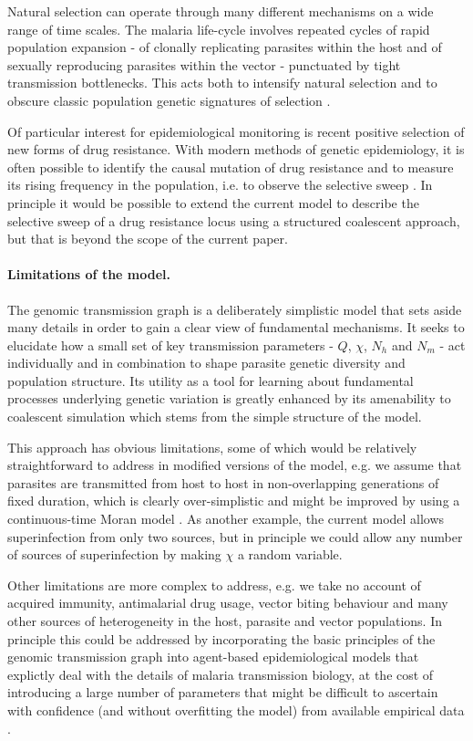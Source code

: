 \documentclass[_main.tex]{subfiles}
\begin{document}
Natural selection can operate through many different mechanisms on a wide range of time scales.  The malaria life-cycle involves repeated cycles of rapid population expansion - of clonally replicating parasites within the host and of sexually reproducing parasites within the vector - punctuated by tight transmission bottlenecks.  This acts both to intensify natural selection and to obscure classic population genetic signatures of selection \cite{Chan2013,Chang2015}.  

Of particular interest for epidemiological monitoring is recent positive selection of new forms of drug resistance.  With modern methods of genetic epidemiology, it is often possible to identify the causal mutation of drug resistance and to measure its rising frequency in the population, i.e. to observe the selective sweep \cite{Anderson2017,Amato2018}.  In principle it would be possible to extend the current model to describe the selective sweep of a drug resistance locus using a structured coalescent approach, but that is beyond the scope of the current paper.

\paragraph{Limitations of the model.}  The genomic transmission graph is a deliberately simplistic model that sets aside many details in order to gain a clear view of fundamental mechanisms.  It seeks to elucidate how a small set of key transmission parameters - $Q$, $\chi$, $N_h$ and $N_m$ - act individually and in combination to shape parasite genetic diversity and population structure.  Its utility as a tool for learning about fundamental processes underlying genetic variation is greatly enhanced by its amenability to coalescent simulation which stems from the simple structure of the model.

This approach has obvious limitations, some of which would be relatively straightforward to address in modified versions of the model, e.g. we assume that parasites are transmitted from host to host in non-overlapping generations of fixed duration, which is clearly over-simplistic and might be improved by using a continuous-time Moran model \cite{Hendry2021}.  As another example, the current model allows superinfection from only two sources, but in principle we could allow any number of sources of superinfection by making $\chi$ a random variable.

Other limitations are more complex to address, e.g. we take no account of acquired immunity, antimalarial drug usage, vector biting behaviour and many other sources of heterogeneity in the host, parasite and vector populations.   In principle this could be addressed by incorporating the basic principles of the genomic transmission graph into agent-based epidemiological models that explictly deal with the details of malaria transmission biology, at the cost of introducing a large number of parameters that might be difficult to ascertain with confidence (and without overfitting the model) from available empirical data \cite{Eckhoff2012,Daniels2015,Griffin2016,Watson2020}.
\end{document}
